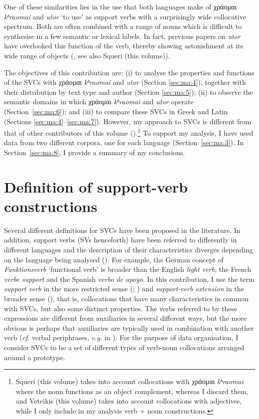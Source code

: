 \documentclass[output=paper,colorlinks,citecolor=brown]{langscibook}
\begin{document}
One of these similarities lies in the use that both languages make of χράομαι
\emph{kʰraomai} and \emph{utor} `to use' as support verbs with a
surprisingly wide collocative spectrum. Both are often combined with a range of nouns
which is difficult to synthesise in a few semantic or lexical labels. In fact, previous
papers on \emph{utor} have overlooked this function of the verb, thereby showing
astonishment at its wide range of objects (\cite{alonso_fernandez_estructuras_2010}, see
also Squeri (this volume)).

The objectives of this contribution are: (i) to analyse the properties and functions of
the SVCs with χράομαι \emph{kʰraomai} and \emph{utor} (Section
\ref{sec:ma:4}), together with their distribution by text type and author (Section
\ref{sec:ma:5}); (ii) to observe the semantic domains in which χράομαι
\emph{kʰraomai} and \emph{utor} operate (Section~\ref{sec:ma:6}); and
(iii) to compare these SVCs in Greek and Latin (Sections \ref{sec:ma:4}--\ref{sec:ma:7}).
However, my approach to SVCs is different from that of other contributors of this volume
().\footnote{Squeri (this
  volume) takes into account collocations with χράομαι
  \emph{kʰraomai} where the noun functions as an object complement,
  whereas I discard them, and Veteikis (this volume) takes into account
  collocations with adjectives, while I only include in my analysis verb + noun
  constructions.} To support my analysis, I have used data from two different corpora,
one for each language (Section~\ref{sec:ma:3}). In Section~\ref{sec:ma:8}, I provide a
summary of my conclusions. 

\section{Definition of support-verb constructions}\label{sec:ma:2}

Several different definitions for SVCs have been proposed in the literature. In addition,
support verbs (SVs henceforth) have been referred to differently in different languages and the
description of their characteristics diverges depending on the language being analysed
(\cite[27]{banos_latin_2022}). For example, the German concept of \emph{Funktionsverb}
`functional verb' is broader than the English \emph{light verb}, the French \emph{verbe
  support} and the Spanish \emph{verbo de apoyo}. In this contribution, I use the term
\emph{support verb} in the more restricted sense (\cite{vives_aspect_1984};
\cite{alonso_ramos_construcciones_2004}) and \emph{support-verb extension} in the broader
sense (\cite{banos_consilium_2014}), that is, collocations that have many characteristics
in common with SVCs, but also some distinct properties. The verbs referred to by these
expressions are different from auxiliaries in several different ways, but the more obvious
is perhaps that auxiliaries are typically used in combination with another verb
(\emph{cf}. verbal periphrases, \emph{e.g.} in \citealt{bentein_verbal_2016}). For the
purpose of data organisation, I consider SVCs to be a set of different types of verb-noun
collocations arranged around a prototype.
\end{document}
